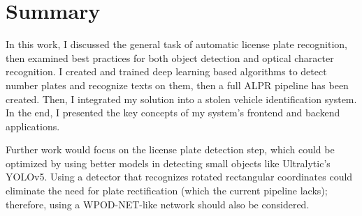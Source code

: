 \chapter{Summary}

In this work, I discussed the general task of automatic license plate recognition, then examined best practices for both object detection and optical character recognition. I created and trained deep learning based algorithms to detect number plates and recognize texts on them, then a full ALPR pipeline has been created. Then, I integrated my solution into a stolen vehicle identification system. In the end, I presented the key concepts of my system's frontend and backend applications.

Further work would focus on the license plate detection step, which could be optimized by using better models in detecting small objects like Ultralytic's YOLOv5\cite{YOLOv5}. Using a detector that recognizes rotated rectangular coordinates could eliminate the need for plate rectification (which the current pipeline lacks); therefore, using a WPOD-NET-like network should also be considered.